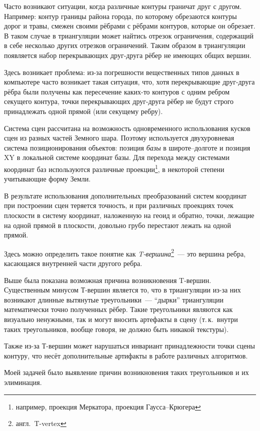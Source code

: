\documentclass[a4paper,10pt,titlepage]{report}
\begin{document}
Часто возникают ситуации, когда различные контуры граничат друг с другом.
Например: контур границы района города, по которому обрезаются контуры дорог и травы,
смежен своими рёбрами с рёбрами контуров, которые он обрезает.
В таком случае в триангуляции может найтись отрезок ограничения,
содержащий в себе несколько других отрезков ограничений.
Таким образом в триангуляции появляется набор перекрывающих друг-друга рёбер не имеющих общих вершин.

Здесь возникает проблема: из-за погрешности вещественных типов данных в компьютере
часто возникает такая ситуация, что, хотя перекрывающие друг-друга рёбра были получены как пересечение
каких-то контуров с одним ребром секущего контура, 
точки перекрывающих друг-друга рёбер не будут строго принадлежать одной прямой (или секущему ребру).

Система сцен рассчитана на возможность одновременного использования кусков сцен из разных частей Земного шара.
Поэтому используется двухуровневая система позиционирования объектов: 
позиция \textit{базы} в широте--долготе и позиция XY в локальной системе координат базы.
Для перехода между системами координат баз используются различные 
проекции\footnote{например, проекция Меркатора, проекция Гаусса--Крюгера}, 
в некоторой степени учитывающие форму Земли.

В результате использования дополнительных преобразований систем координат при построении сцен 
теряется точность, 
и при различных проекциях точек плоскости в систему координат, наложенную на геоид и обратно,
точки, лежащие на одной прямой в плоскости, довольно грубо перестают лежать на одной прямой.

Здесь можно определить такое понятие как \textit{T-вершина}\footnote{англ.~T-vertex}~--- 
это вершина ребра, касающаяся внутренней части другого ребра.

Выше была показана возможная причина возникновения T-вершин.
Существенным минусом Т-вершин является то, 
что в триангуляции из-за них возникают длинные вытянутые треугольники~--- 
``дырки'' триангуляции математически точно полученных рёбер.
Такие треугольники являются как визуально ненужными, 
так и могут вносить артефакты в сцену
(т.\,к.~внутри таких треугольников, вообще говоря, не должно быть никакой текстуры).

Также из-за Т-вершин может нарушаться инвариант принадлежности точки сцены контуру,
что несёт дополнительные артифакты в работе различных алгоритмов.

Моей задачей было выявление причин возникновения таких треугольников и их элиминация.
\end{document}
